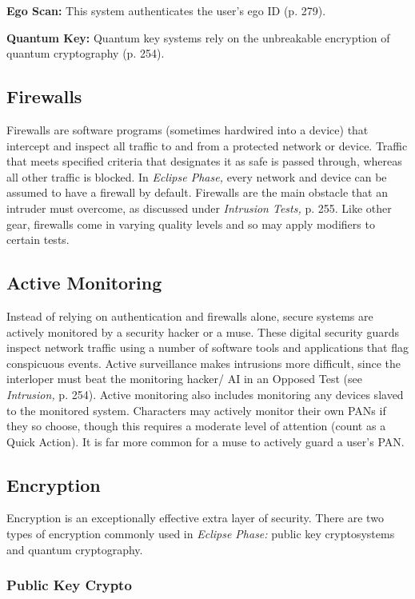 \textbf{Ego Scan:} This system authenticates the user's ego ID (p. 279). 

\textbf{Quantum Key:} Quantum key systems rely on the unbreakable encryption of quantum cryptography (p. 254). 

\subsection{Firewalls} 

Firewalls are software programs (sometimes hardwired into a device) that intercept and inspect all traffic to and from a protected network or device. Traffic that meets specified criteria that designates it as safe is passed through, whereas all other traffic is blocked. In \textit{Eclipse Phase,} every network and device can be assumed to have a firewall by default. Firewalls are the main obstacle that an intruder must overcome, as discussed under \textit{Intrusion Tests,} p. 255. Like other gear, firewalls come in varying quality levels and so may apply modifiers to certain tests. 

\subsection{Active Monitoring} 

Instead of relying on authentication and firewalls alone, secure systems are actively monitored by a security hacker or a muse. These digital security guards inspect network traffic using a number of software tools and applications that flag conspicuous events. Active surveillance makes intrusions more difficult, since the interloper must beat the monitoring hacker/ AI in an Opposed Test (see \textit{Intrusion,} p. 254). Active monitoring also includes monitoring any devices slaved to the monitored system. Characters may actively monitor their own PANs if they so choose, though this requires a moderate level of attention (count as a Quick Action). It is far more common for a muse to actively guard a user's PAN. 

\subsection{Encryption} 

Encryption is an exceptionally effective extra layer of security. There are two types of encryption commonly used in \textit{Eclipse Phase:} public key cryptosystems and quantum cryptography. 

\subsubsection{Public Key Crypto} 

